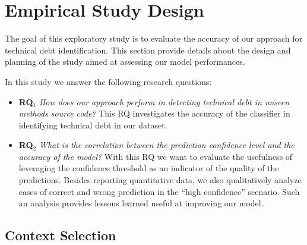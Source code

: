 \chapter{Empirical Study Design}


The goal of this exploratory study is to evaluate the accuracy of our approach for technical debt identification.
This section provide details about the design and planning of the study aimed at assessing our model performances.
 

In this study we answer the following research questions:
\begin{itemize}
    \item \textbf{RQ$_1$} \textit{How does our approach perform in detecting technical debt in unseen methods source code?} This RQ investigates the accuracy of the classifier in identifying technical debt in our dataset.
    \item \textbf{RQ$_2$} \textit{What is the correlation between the prediction confidence level and the accuracy of the model?} With this RQ we want to evaluate the usefulness of leveraging the confidence threshold as an indicator of the quality of the predictions. Besides reporting quantitative data, we also qualitatively analyze cases of correct and wrong prediction in the ``high confidence'' scenario. Such an analysis provides lessons learned useful at improving our model.
\end{itemize}
 


\section{Context Selection}
% 


